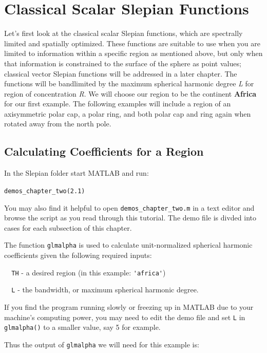 \documentclass[11pt]{article}
\begin{document}
\section{Classical Scalar Slepian Functions}
%
Let's first look at the classical scalar Slepian functions, which are spectrally limited and spatially optimized. These functions are suitable to use when you are limited to information within a specific region as mentioned above, but only when that information is constrained to the surface of the sphere as point values; classical vector Slepian functions will be addressed in a later chapter. The functions will be bandlimited by the maximum spherical harmonic degree \textit{L} for region of concentration \textit{R}. We will choose our region to be the continent \textbf{Africa} for our first example. The following examples will include a region of an axisymmetric polar cap, a polar ring, and both polar cap and ring again when rotated away from the north pole.

\subsection{Calculating Coefficients for a Region}

In the Slepian folder start MATLAB and run: 

\verb|demos_chapter_two(2.1)|

You may also find it helpful to open \verb|demos_chapter_two.m| in a text editor and browse the script as you read through this tutorial. The demo file is divded into cases for each subsection of this chapter. 

The function \verb+glmalpha+ is used to calculate unit-normalized spherical harmonic coefficients given the following required inputs:

\verb+	TH+ - a desired region (in this example: \verb+'africa'+)

\verb+	L+ - the bandwidth, or maximum spherical harmonic degree. 

If you find the program running slowly or freezing up in MATLAB due to your machine's computing power, you may need to edit the demo file and set \verb|L| in \verb|glmalpha()| to a smaller value, say 5 for example.

Thus the output of \verb+glmalpha+ we will need for this example is:
\end{document}
